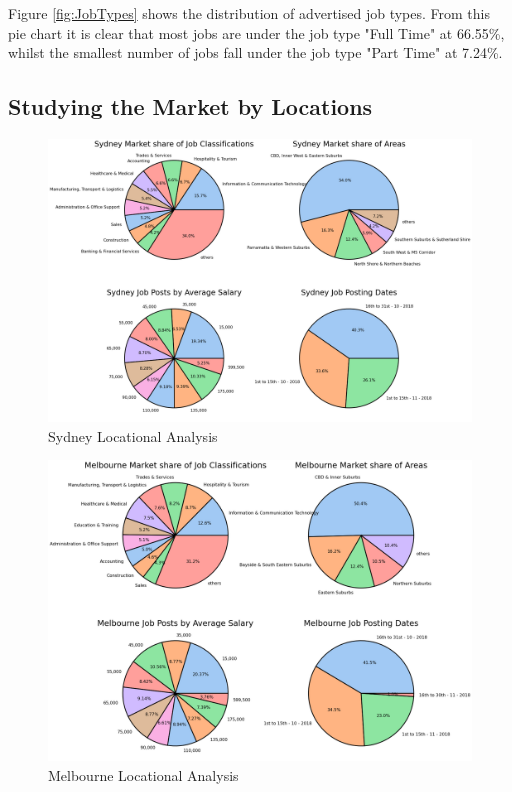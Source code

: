 \documentclass[twoside, 12pt, a4paper]{article}
\begin{document}
Figure \ref{fig:JobTypes} shows the distribution of advertised job types. From this pie chart it is clear that most jobs are under the job type "Full Time" at 66.55\%, whilst the smallest number of jobs fall under the job type "Part Time" at 7.24\%. 

\newpage
\subsection{Studying the Market by Locations}

\begin{figure}[h]
	\centering
	\includegraphics[scale = 0.26]{SydneyLocational.png}
	\caption{Sydney Locational Analysis}
	\label{fig:SydneyLoc}
\end{figure}

\begin{figure}[h!]
	\centering
	\includegraphics[scale = 0.26]{MelbourneLocational.png}
	\caption{Melbourne Locational Analysis}
	\label{fig:MelbLoc}
\end{figure}
\end{document}

